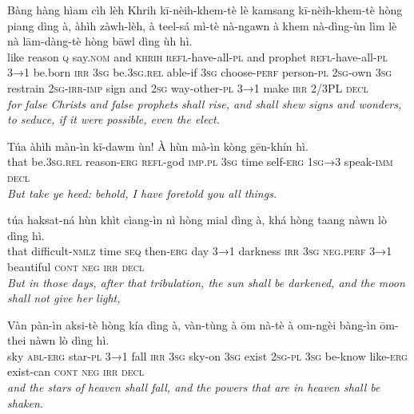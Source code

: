 \documentclass[11pt,a4paper]{article}
\begin{document}
\begin{exe}
\gll Bàng hàng hìam cìh lèh Khrih kī-nèih-khem-tè lè kamsang kī-nèih-khem-tè hòng piang dìng à, àhìh zàwh-lèh, à teel-sá mì-tè nà-ngawn à khem nà-dìng-ùn lìm lè nà lām-dàng-tè hòng bāwl dìng ùh hì. \\
     like reason \textsc{q} say.\textsc{nom} and \textsc{khrih} \textsc{refl}-have-all-\textsc{pl} and prophet \textsc{refl}-have-all-\textsc{pl} \textsc{3→1} be.born \textsc{irr} \textsc{3sg} be.\textsc{3sg}.\textsc{rel} able-if \textsc{3sg} choose-\textsc{perf} person-\textsc{pl} \textsc{2sg}-own \textsc{3sg} restrain \textsc{2sg}-\textsc{irr}-\textsc{imp} sign and \textsc{2sg} way-other-\textsc{pl} \textsc{3→1} make \textsc{irr} 2/3PL \textsc{decl} \\
\glt \textcolor{kjvcolor}{\textit{for false Christs and false prophets shall rise, and shall shew signs and wonders, to seduce, if it were possible, even the elect.}}

\gll Túa àhìh màn-ìn kī-dawm ùn! À hùn mà-ìn kòng gēn-khín hì. \\
     that be.\textsc{3sg}.\textsc{rel} reason-\textsc{erg} \textsc{refl}-god \textsc{imp}.\textsc{pl} \textsc{3sg} time self-\textsc{erg} \textsc{1sg→3} speak-\textsc{imm} \textsc{decl} \\
\glt \textcolor{kjvcolor}{\textit{But take ye heed: behold, I have foretold you all things.}}

\gll túa haksat-ná hùn khìt cìang-ìn nì hòng mial dìng à, khá hòng taang nàwn lò dìng hì. \\
     that difficult-\textsc{nmlz} time \textsc{seq} then-\textsc{erg} day \textsc{3→1} darkness \textsc{irr} \textsc{3sg} \textsc{neg}.\textsc{perf} \textsc{3→1} beautiful \textsc{cont} \textsc{neg} \textsc{irr} \textsc{decl} \\
\glt \textcolor{kjvcolor}{\textit{But in those days, after that tribulation, the sun shall be darkened, and the moon shall not give her light,}}

\gll Vàn pàn-ìn aksi-tè hòng kía dìng à, vàn-tùng à ōm nà-tè à om-ngèi bàng-ìn ōm-thei nàwn lò dìng hì. \\
     sky \textsc{abl}-\textsc{erg} star-\textsc{pl} \textsc{3→1} fall \textsc{irr} \textsc{3sg} sky-on \textsc{3sg} exist \textsc{2sg}-\textsc{pl} \textsc{3sg} be-know like-\textsc{erg} exist-can \textsc{cont} \textsc{neg} \textsc{irr} \textsc{decl} \\
\glt \textcolor{kjvcolor}{\textit{and the stars of heaven shall fall, and the powers that are in heaven shall be shaken.}}


\end{exe}
\end{document}
